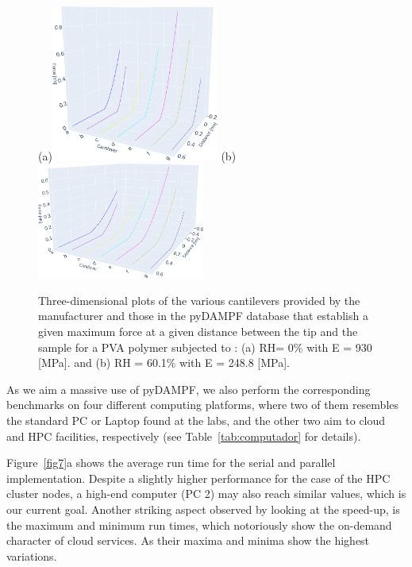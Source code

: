 \documentclass[letterpaper,compsoc,twoside]{IEEEtran}
\begin{document}
\begin{figure}[]
\centering
\subfigure(a){\includegraphics[width=55mm]{./fig6HR0}}
\subfigure(b){\includegraphics[width=55mm]{./fig6HR3}}
\caption{Three-dimensional plots of the various cantilevers provided by the manufacturer and those in the pyDAMPF database that establish a given maximum force at a given distance between the tip and the sample for a PVA polymer subjected to : (a) RH= 0\% with E = 930 [MPa]. and (b) RH = 60.1\% with E = 248.8 [MPa].} \label{fig6}
\end{figure}

As we aim a massive use of pyDAMPF, we also perform the corresponding benchmarks on four different computing platforms, where two of them resembles the standard PC or Laptop found at the labs, and the other two aim to cloud and HPC facilities, respectively (see Table~\ref{tab:computador} for details).

Figure~\ref{fig7}a shows the average run time for the serial and parallel implementation. Despite a slightly higher performance for the case of the HPC cluster nodes, a high-end computer (PC 2) may also reach similar values, which is our current goal. Another striking aspect observed by looking at the speed-up, is the maximum and minimum run times, which notoriously show the on-demand character of cloud services. As their maxima and minima show the highest variations.
\end{document}
